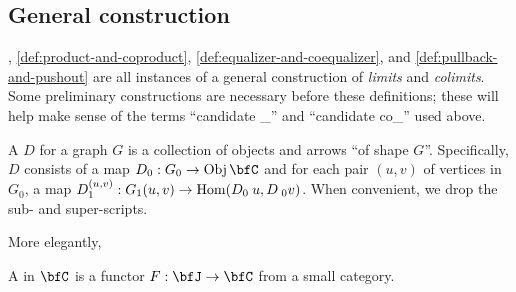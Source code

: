 \documentclass[a5paper]{article}
\begin{document}
\subsection{General construction}

, \cref{def:product-and-coproduct},
\cref{def:equalizer-and-coequalizer}, and \cref{def:pullback-and-pushout}
are all instances of a general construction of \textit{limits} and
\textit{colimits}. Some preliminary constructions are necessary before these
definitions; these will help make sense of the terms ``candidate \_'' and
``candidate co\_'' used above.


\begin{definition}
  A  $D$ for a graph $G$ is a collection
  of objects and arrows ``of shape $G$''. Specifically, $D$ consists of a map
  $D_0:G_0\to \Obj\bfC$ and for each pair $(u,v)$ of vertices in $G_0$,
  a map $D_{1}^{(u,v)}:G_1(u,v)\to \operatorname{Hom}(D_0\hspace{0.23em} u,D\hspace{0.23em} _0{v})$.
  When convenient, we drop the sub- and super-scripts.
\end{definition}

More elegantly,

\begin{definition}
  A  in $\bfC$ is a functor $F:\bfJ\to\bfC$ from
  a small category.
\end{definition}
\end{document}
